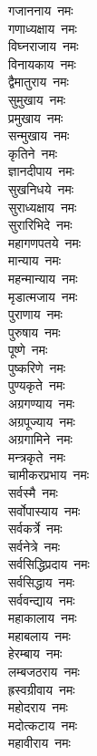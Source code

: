 \begin{multicols}{2}
\begin{flushleft}
गजाननाय~नमः\\
गणाध्यक्षाय~नमः\\
विघ्नराजाय~नमः\\
विनायकाय~नमः\\
द्वैमातुराय~नमः\\
सुमुखाय~नमः\\
प्रमुखाय~नमः\\
सन्मुखाय~नमः\\
कृतिने~नमः\\
ज्ञानदीपाय~नमः\hfill{}\\
सुखनिधये~नमः\\
सुराध्यक्षाय~नमः\\
सुरारिभिदे~नमः\\
महागणपतये~नमः\\
मान्याय~नमः\\
महन्मान्याय~नमः\\
मृडात्मजाय~नमः\\
पुराणाय~नमः\\
पुरुषाय~नमः\\
पूष्णे~नमः\hfill{}\\
पुष्करिणे~नमः\\
पुण्यकृते~नमः\\
अग्रगण्याय~नमः\\
अग्रपूज्याय~नमः\\
अग्रगामिने~नमः\\
मन्त्रकृते~नमः\\
चामीकरप्रभाय~नमः\\
सर्वस्मै~नमः\\
सर्वोपास्याय~नमः\\
सर्वकर्त्रे~नमः\hfill{}\\
सर्वनेत्रे~नमः\\
सर्वसिद्धिप्रदाय~नमः\\
सर्वसिद्धाय~नमः\\
सर्ववन्द्याय~नमः\\
महाकालाय~नमः\\
महाबलाय~नमः\\
हेरम्बाय~नमः\\
लम्बजठराय~नमः\\
ह्रस्वग्रीवाय~नमः\\
महोदराय~नमः\hfill{}\\
मदोत्कटाय~नमः\\
महावीराय~नमः\\

\end{flushleft}
\end{multicols}
